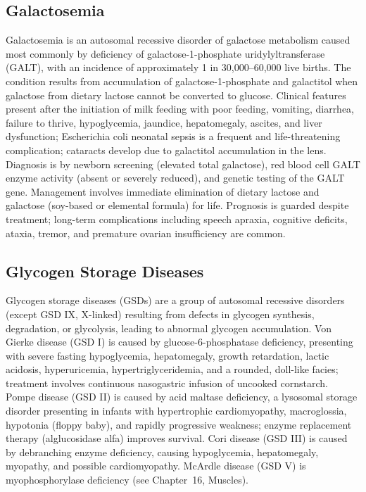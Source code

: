 \subsection{Galactosemia}
\label{sec:Galactosemia}
Galactosemia is an autosomal recessive disorder of galactose metabolism caused most commonly by deficiency of galactose-1-phosphate uridylyltransferase (GALT), with an incidence of approximately 1 in 30,000--60,000 live births. The condition results from accumulation of galactose-1-phosphate and galactitol when galactose from dietary lactose cannot be converted to glucose. Clinical features present after the initiation of milk feeding with poor feeding, vomiting, diarrhea, failure to thrive, hypoglycemia, jaundice, hepatomegaly, ascites, and liver dysfunction; Escherichia coli neonatal sepsis is a frequent and life-threatening complication; cataracts develop due to galactitol accumulation in the lens. Diagnosis is by newborn screening (elevated total galactose), red blood cell GALT enzyme activity (absent or severely reduced), and genetic testing of the GALT gene. Management involves immediate elimination of dietary lactose and galactose (soy-based or elemental formula) for life. Prognosis is guarded despite treatment; long-term complications including speech apraxia, cognitive deficits, ataxia, tremor, and premature ovarian insufficiency are common.

\subsection{Glycogen Storage Diseases}
\label{sec:Glycogen Storage Diseases}
Glycogen storage diseases (GSDs) are a group of autosomal recessive disorders (except GSD IX, X-linked) resulting from defects in glycogen synthesis, degradation, or glycolysis, leading to abnormal glycogen accumulation. Von Gierke disease (GSD I) is caused by glucose-6-phosphatase deficiency, presenting with severe fasting hypoglycemia, hepatomegaly, growth retardation, lactic acidosis, hyperuricemia, hypertriglyceridemia, and a rounded, doll-like facies; treatment involves continuous nasogastric infusion of uncooked cornstarch. Pompe disease (GSD II) is caused by acid maltase deficiency, a lysosomal storage disorder presenting in infants with hypertrophic cardiomyopathy, macroglossia, hypotonia (floppy baby), and rapidly progressive weakness; enzyme replacement therapy (alglucosidase alfa) improves survival. Cori disease (GSD III) is caused by debranching enzyme deficiency, causing hypoglycemia, hepatomegaly, myopathy, and possible cardiomyopathy. McArdle disease (GSD V) is myophosphorylase deficiency (see Chapter~16, Muscles).

